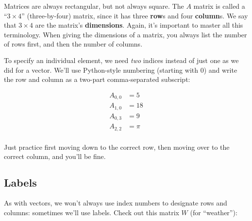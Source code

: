 Matrices are always rectangular, but not always square. The $A$ matrix is
called a ``$3\times 4$'' (three-by-four) matrix, since it has three
\textbf{row}s and four \textbf{column}s. We say that $3\times 4$ are the
matrix's \textbf{dimensions}. Again, it's important to master all this
terminology. When giving the dimensions of a matrix, you always list the number
of rows first, and then the number of columns.


To specify an individual element, we need \textit{two} indices instead of just
one as we did for a vector. We'll use Python-style numbering (starting with 0)
and write the row and column as a two-part comma-separated subscript:

\vspace{-.15in}
\begin{align*}
A_{0,0} &= 5 \\
A_{1,0} &= 18 \\
A_{0,3} &= 9 \\
A_{2,2} &= \pi \\
\end{align*}
\vspace{-.25in}

Just practice first moving down to the correct row, then moving over to the
correct column, and you'll be fine.

\subsection{Labels}


As with vectors, we won't always use index numbers to designate rows and
columns: sometimes we'll use labels. Check out this matrix $W$ (for
``weather''):

